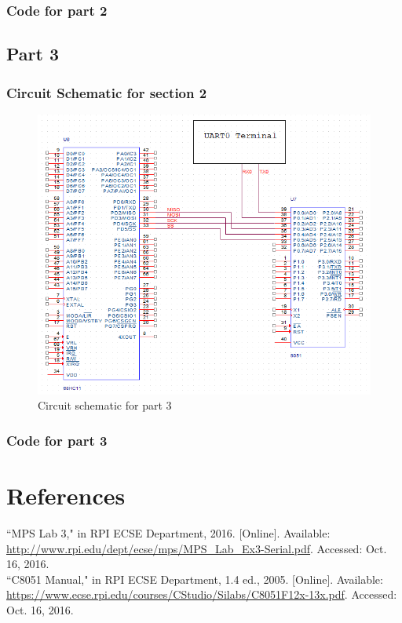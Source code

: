 \documentclass[12pt]{article}
\begin{document}
	\subsubsection{Code for part 2}
			

\subsection{Part 3}
	\subsubsection{Circuit Schematic for section 2}
		\begin{figure}[H]
			\centering
			\includegraphics[width=\textwidth]{Part3Schematic.png}
			\caption{Circuit schematic for part 3}
			\label{schematic3}
		\end{figure}
	\pagebreak
	\subsubsection{Code for part 3}
		
	
\section{References} 
\noindent
``MPS Lab 3," in RPI ECSE Department, 2016. [Online]. Available: \url{http://www.rpi.edu/dept/ecse/mps/MPS_Lab_Ex3-Serial.pdf}. Accessed: Oct. 16, 2016.\\
\newline\noindent
``C8051 Manual," in RPI ECSE Department, 1.4 ed., 2005. [Online]. Available: \url{https://www.ecse.rpi.edu/courses/CStudio/Silabs/C8051F12x-13x.pdf}. Accessed: Oct. 16, 2016.
\end{document}
